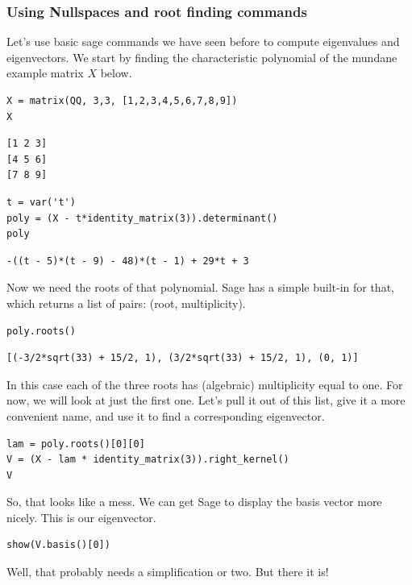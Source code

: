 \documentclass[10pt,]{book}
\theoremstyle{plain}
\theoremstyle{definition}
\numberwithin{equation}{section}
\begin{document}
\subsubsection[Using Nullspaces and root finding commands]{Using Nullspaces and root finding commands}\label{subsubsection-48}

        Let's use basic sage commands we have seen before to compute eigenvalues
        and eigenvectors. We start by finding the characteristic polynomial of
        the mundane example matrix \(X\) below.
\begin{lstlisting}[style=sageinput]
X = matrix(QQ, 3,3, [1,2,3,4,5,6,7,8,9])
X
\end{lstlisting}
\begin{lstlisting}[style=sageoutput]
[1 2 3]
[4 5 6]
[7 8 9]
\end{lstlisting}
\begin{lstlisting}[style=sageinput]
t = var('t')
poly = (X - t*identity_matrix(3)).determinant()
poly
\end{lstlisting}
\begin{lstlisting}[style=sageoutput]
-((t - 5)*(t - 9) - 48)*(t - 1) + 29*t + 3
\end{lstlisting}
\par

        Now we need the roots of that polynomial. Sage has a simple built-in for
        that, which returns a list of pairs: (root, multiplicity).
\begin{lstlisting}[style=sageinput]
poly.roots()
\end{lstlisting}
\begin{lstlisting}[style=sageoutput]
[(-3/2*sqrt(33) + 15/2, 1), (3/2*sqrt(33) + 15/2, 1), (0, 1)]
\end{lstlisting}
\par

        In this case each of the three roots has (algebraic) multiplicity equal
        to one. For now, we will look at just the first one. Let's pull it out of
        this list, give it a more convenient name, and use it to find a corresponding
        eigenvector.
\begin{lstlisting}[style=sageinput]
lam = poly.roots()[0][0]
V = (X - lam * identity_matrix(3)).right_kernel()
V
\end{lstlisting}
\par

        So, that looks like a mess. We can get Sage to display the basis vector
        more nicely. This is our eigenvector.
\begin{lstlisting}[style=sageinput]
show(V.basis()[0])
\end{lstlisting}
\par
Well, that probably needs a simplification or two. But there it is!%
\typeout{************************************************}
\typeout{************************************************}
\end{document}
